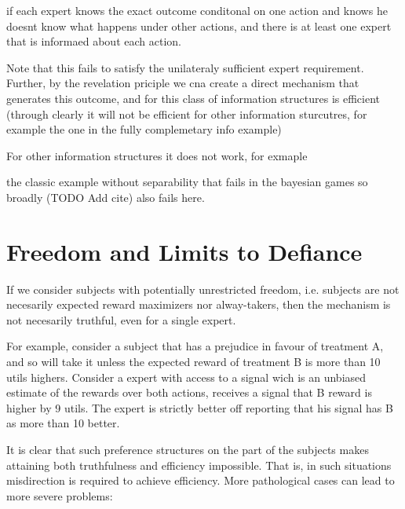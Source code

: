 \begin{lem}
	if each expert knows the exact outcome conditonal on one action and knows he doesnt know what happens under other actions, and there is at least one expert that is informaed about each action.
\end{lem}

Note that this fails to satisfy the unilateraly sufficient expert requirement. Further, by the revelation priciple we cna create a direct mechanism that generates this outcome, and for this class of information structures is efficient (through clearly it will not be efficient for other information sturcutres, for example the one in the fully complemetary info example)

For other information structures it does not work, for exmaple 
\begin{eg}
	the classic example without separability that fails in the bayesian games so broadly (TODO Add cite) also fails here. 
\end{eg}





\section{Freedom and Limits to Defiance}

If we consider subjects with potentially unrestricted freedom, i.e. subjects are not necesarily expected reward maximizers nor alway-takers, then the mechanism is not necesarily truthful, even for a single expert. 

\begin{eg}
	For example, consider a subject that has a prejudice in favour of treatment A, and so will take it unless the expected reward of treatment B is more than 10 utils highers. Consider a expert with access to a signal wich is an unbiased estimate of the rewards over both actions, receives a signal  that B reward is higher by 9 utils. The expert is strictly better off reporting that his signal has B as more than 10 better.
\end{eg}

It is clear that such preference structures on the part of the subjects makes attaining both truthfulness and efficiency impossible. That is, in such situations misdirection is required to achieve efficiency. More pathological cases can lead to more severe problems:

